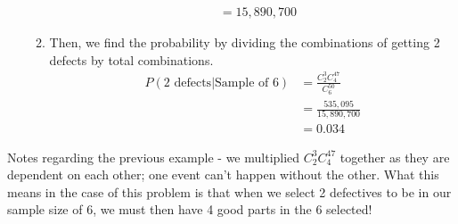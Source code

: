 \documentclass[../INDE315.tex]{subfiles}
\begin{document}
\begin{enumerate}
\begin{enumerate}
\begin{equation*}
\begin{aligned}
                                &= 15,890,700
                    \end{aligned}
                \end{equation*}
            \item Then, we find the probability by dividing the combinations of getting 2 defects by total combinations.
                \begin{equation*}
                    \begin{aligned}
                        P(2\text{ defects}|\text{Sample of }6) &= \frac{C^3_2 C^{47}_4}{C^{50}_6} \\
                                &= \frac{535,095}{15,890,700} \\
                                &= 0.034
                    \end{aligned}
                \end{equation*}
        \end{enumerate}
\end{enumerate}
Notes regarding the previous example - we multiplied $C^3_2 C^{47}_4$ together as they are dependent on each other; one event can't happen without the other. What this means in the case of this problem is that when we select 2 defectives to be in our sample size of 6, we must then have 4 good parts in the 6 selected!
\end{document}
